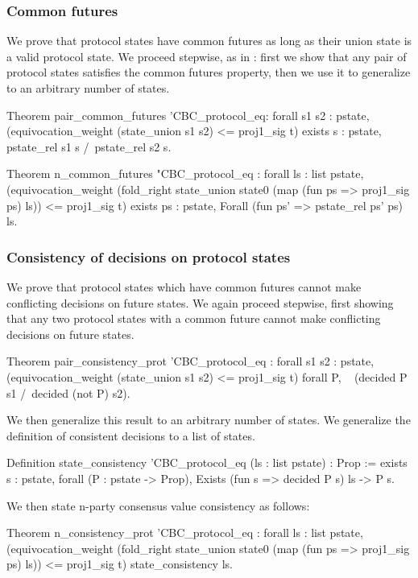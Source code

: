 \documentclass[runningheads]{llncs}
\begin{document}
\subsubsection{Common futures} 
We prove that protocol states have common futures as long as their union state is a valid protocol state. We proceed stepwise, as in \cite{CBCfull}: first we show that any pair of protocol states satisfies the common futures property, then we use it to generalize to an arbitrary number of states. 
\begin{coq}
Theorem pair_common_futures '{CBC_protocol_eq}:
	forall s1 s2 : pstate,
	(equivocation_weight (state_union s1 s2) <= proj1_sig t)%
	exists s : pstate, pstate_rel s1 s /\ pstate_rel s2 s.
	
Theorem n_common_futures "{CBC_protocol_eq} :
forall ls : list pstate,
(equivocation_weight (fold_right state_union state0 (map (fun ps => proj1_sig ps) ls)) <= proj1_sig t)%
exists ps : pstate, Forall (fun ps' => pstate_rel ps' ps) ls.
\end{coq}	

\subsubsection{Consistency of decisions on protocol states}
We prove that protocol states which have common futures cannot make conflicting decisions on future states. We again proceed stepwise, first showing that any two protocol states with a common future cannot make conflicting decisions on future states. 
\begin{coq}
Theorem pair_consistency_prot '{CBC_protocol_eq} :
	forall s1 s2 : pstate,
	(equivocation_weight (state_union s1 s2) <= proj1_sig t)%
	forall P, 
	~ (decided P s1 /\ decided (not P) s2).
\end{coq}
We then generalize this result to an arbitrary number of states. We generalize the definition of consistent decisions to a list of states. 
\begin{coq}
Definition state_consistency '{CBC_protocol_eq} (ls : list pstate) : Prop :=
exists s : pstate,
forall (P : pstate -> Prop),
Exists (fun s => decided P s) ls ->
P s.
\end{coq}
We then state n-party consensus value consistency as follows: 
\begin{coq}
Theorem n_consistency_prot '{CBC_protocol_eq} :
forall ls : list pstate,
(equivocation_weight (fold_right state_union state0 (map (fun ps => proj1_sig ps) ls)) <= proj1_sig t)%
state_consistency ls.
\end{coq}
\end{document}
